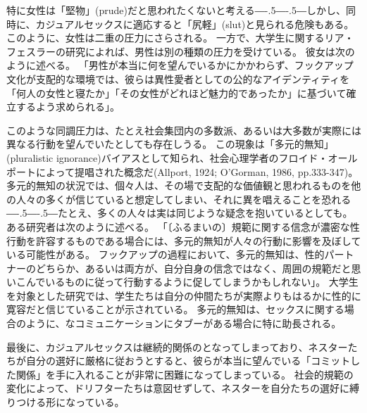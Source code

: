 \documentclass[paper=a4,book,openany]{jlreq}
\def\DDASH{―\kern-.5\zw―\kern-.5\zw―} %
\begin{document}
特に女性は「堅物」(prude)だと思われたくないと考える{\DDASH}しかし、同時に、カジュアルセックスに適応すると「尻軽」(slut)と見られる危険もある。
このように、女性は二重の圧力にさらされる。
一方で、大学生に関するリア・フェスラーの研究によれば、男性は別の種類の圧力を受けている。
彼女は次のように述べる。
「男性が本当に何を望んでいるかにかかわらず、フックアップ文化が支配的な環境では、彼らは異性愛者としての公的なアイデンティティを「何人の女性と寝たか」「その女性がどれほど魅力的であったか」に基づいて確立するよう求められる」\citep{fessler16:_lot_women_dont}。

このような同調圧力は、たとえ社会集団内の多数派、あるいは大多数が実際には異なる行動を望んでいたとしても存在しうる。
この現象は「多元的無知」(pluralistic ignorance)バイアスとして知られ、社会心理学者のフロイド・オールポートによって提唱された概念だ(Allport, 1924; O'Gorman, 1986, pp.333-347)。
\nocite{allport24:_social_psyc,ogorman86:_disc_plur_ignor}多元的無知の状況では、個々人は、その場で支配的な価値観と思われるものを他の人々の多くが信じていると想定してしまい、それに異を唱えることを恐れる{\DDASH}たとえ、多くの人々は実は同じような疑念を抱いているとしても。
ある研究者は次のように述べる。
「〔ふるまいの〕規範に関する信念が濃密な性行動を許容するものである場合には、多元的無知が人々の行動に影響を及ぼしている可能性がある。
フックアップの過程において、多元的無知は、性的パートナーのどちらか、あるいは両方が、自分自身の信念ではなく、周囲の規範だと思いこんでいるものに従って行動するように促してしまうかもしれない」\citep[p.130]{griggs03:_plur_ignor_hook_up}。
大学生を対象とした研究では、学生たちは自分の仲間たちが実際よりもはるかに性的に寛容だと信じていることが示されている\citep{chia06:_how_media_cont,reiber10:_hook_up}。
多元的無知は、セックスに関する場合のように、なコミュニケーションにタブーがある場合に特に助長される。

最後に、カジュアルセックスは継続的関係のとなってしまっており、ネスターたちが自分の選好に厳格に従おうとすると、彼らが本当に望んでいる「コミットした関係」を手に入れることが非常に困難になってしまっている。
社会的規範の変化によって、ドリフターたちは意図せずして、ネスターを自分たちの選好に縛りつける形になっている。
\end{document}

